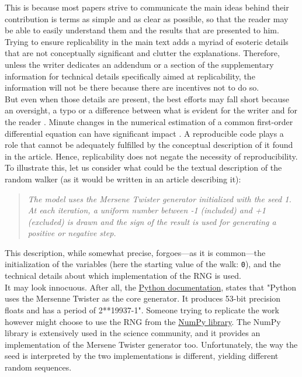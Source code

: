 \documentclass[a4paper,11pt]{article}
\begin{document}
This is because most papers strive to communicate the main ideas behind their contribution is terms as simple and as clear as possible, so that the reader may be able to easily understand them and the results that are presented to him. Trying to ensure replicability in the main text adds a myriad of esoteric details that are not conceptually significant and clutter the explanations. Therefore, unless the writer dedicates an addendum or a section of the supplementary information for technical details specifically aimed at replicability, the information will not be there because there are incentives not to do so.\\

But even when those details are present, the best efforts may fall short because an oversight, a typo or a difference between what is evident for the writer and for the reader \citep{Mesnard:2016}. Minute changes in the numerical estimation of a common first-order differential equation can have significant impact \citep{Crook:2013}. A reproducible code plays a role that cannot be adequately fulfilled by the conceptual description of it found in the article. Hence, replicability does not negate the necessity of reproducibility. To illustrate this, let us consider what could be the textual description of the random walker (as it would be written in an article describing it):
%
\begin{quotation}
{\em The model uses the Mersene Twister generator initialized with the seed 1. At each iteration, a uniform number between -1 (included) and +1 (excluded) is drawn and the sign of the result is used for generating a positive or negative step.}
\end{quotation}
%
This description, while somewhat precise, forgoes---as it is common---the initialization of the variables (here the starting value of the walk: {\tt 0}), and the technical details about which implementation of the RNG is used.\\

It may look innocuous. After all, the
\href{https://docs.python.org/3.6/library/random.html}{Python documentation},
states that "Python uses the Mersenne Twister as the core generator. It produces
53-bit precision floats and has a period of 2**19937-1". Someone trying to replicate the work however might choose to use the RNG from the \href{http://www.numpy.org/}{NumPy library}.  The NumPy library is extensively used in the science community, and it provides an implementation of the Mersene Twister generator too. Unfortunately, the way the seed is interpreted by the two implementations is different, yielding different random sequences.\\
\end{document}
